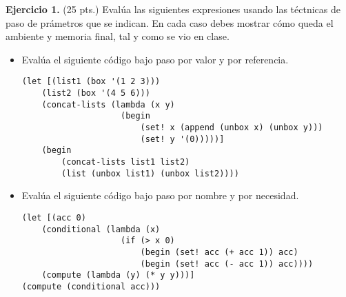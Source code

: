 \textbf{Ejercicio 1.} (25 pts.) Evalúa las siguientes expresiones usando las téctnicas de paso de prámetros que se indican. En cada caso debes mostrar cómo queda el ambiente y memoria final, tal y como se vio en clase. \vspace{0.3cm}

\begin{itemize}
    \item Evalúa el siguiente código bajo paso por valor y por referencia.
\begin{lstlisting}
(let [(list1 (box '(1 2 3)))
    (list2 (box '(4 5 6)))
    (concat-lists (lambda (x y)
                    (begin
                        (set! x (append (unbox x) (unbox y)))
                        (set! y '(0)))))]
    (begin
        (concat-lists list1 list2)
        (list (unbox list1) (unbox list2))))
\end{lstlisting}

    \item Evalúa el siguiente código bajo paso por nombre y por necesidad.
\begin{lstlisting}
(let [(acc 0)
    (conditional (lambda (x)
                    (if (> x 0)
                        (begin (set! acc (+ acc 1)) acc)
                        (begin (set! acc (- acc 1)) acc))))
    (compute (lambda (y) (* y y)))]
(compute (conditional acc)))
\end{lstlisting}
\end{itemize}


